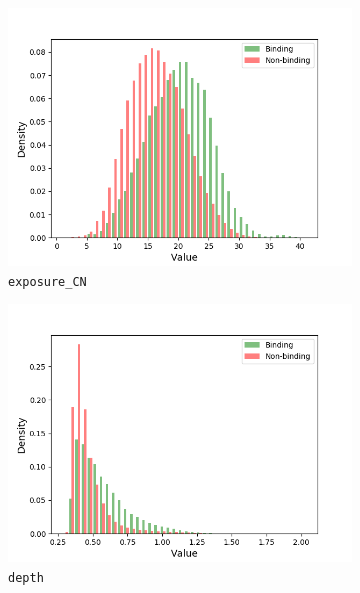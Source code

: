\begin{figure}[!htbp]
\centering
\begin{subfigure}{.5\textwidth}
  \centering
  \includegraphics[width=1\linewidth]{../img/exposure_CN_hist.png}
  \caption{\texttt{exposure\_CN}}
\end{subfigure}%
\begin{subfigure}{.5\textwidth}
  \centering
  \includegraphics[width=1\linewidth]{../img/depth_hist.png}
  \caption{\texttt{depth}}
\end{subfigure}
\begin{subfigure}{.5\textwidth}
  \centering

\end{subfigure}
\end{figure}
